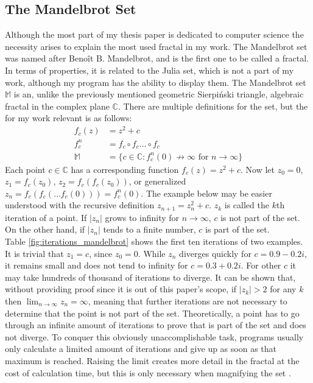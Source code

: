 \documentclass[10pt,a4paper,titlepage]{article}
\begin{document}
	\subsection{The Mandelbrot Set}
	Although the most part of my thesis paper is dedicated to computer science the necessity arises to explain the most used fractal in my work. The Mandelbrot set was named after Benoît B. Mandelbrot, and is the first one to be called a fractal. In terms of properties, it is related to the Julia set, which is not a part of my work, although my program has the ability to display them. The Mandelbrot set \(\mathbb{M}\) is an, unlike the previously mentioned geometric Sierpiński triangle, algebraic fractal in the complex plane \(\mathbb{C}\). There are multiple definitions for the set, but the for my work relevant is as follows:
	\begin{align*}
			f_{c}(z)&=z^2 + c\\
			f_{c}^{n} &= f_{c} \circ f_{c} \dots \circ f_{c}\\
			\mathbb{M} &= \{c \in \mathbb{C}: f_{c}^{n}(0)\not\to\infty \text{ for } n \to \infty\}
	\end{align*}
	Each point \(c \in \mathbb{C}\) has a corresponding function \(f_c(z)=z^2 +c\). Now let \(z_0=0\), \(z_1 = f_c(z_0)\), \(z_2 = f_c(f_c(z_0))\), or generalized \(z_n = f_c(f_c(\dots f_c(0)))= f_c^n(0)\). The example below may be easier understood with the recursive definition \(z_{n+1}=z_n^2+c\). \(z_k\) is called the \(k\)th iteration of a point. If \(|z_n|\) grows to infinity for \(n \to \infty\), \(c\) is not part of the set. On the other hand, if \(|z_n|\) tends to a finite number, \(c\) is part of the set.\\
	Table \ref{fig:iterations_mandelbrot} shows the first ten iterations of two examples. It is trivial that \(z_1=c\), since \(z_0 = 0\). While \(z_n\) diverges quickly for \(c=0.9 - 0.2i\), it remains small and does not tend to infinity for \(c=0.3+0.2i\). For other \(c\) it may take hundreds of thousand of iterations to diverge. It can be shown that, without providing proof since it is out of this paper's scope, if \(|z_{k}| > 2\) for any \(k\) then \(\lim_{n\to\infty}z_{n} = \infty\), meaning that further iterations are not necessary to determine that the point is not part of the set. Theoretically, a point has to go through an infinite amount of iterations to prove that is part of the set and does not diverge. To conquer this obviously unaccomplishable task, programs usually only calculate a limited amount of iterations and give up as soon as that maximum is reached. Raising the limit creates more detail in the fractal at the cost of calculation time, but this is only necessary when magnifying the set \cite[Chapter 14.2]{FalconerKennethJ1993FG:m}.
\end{document}
